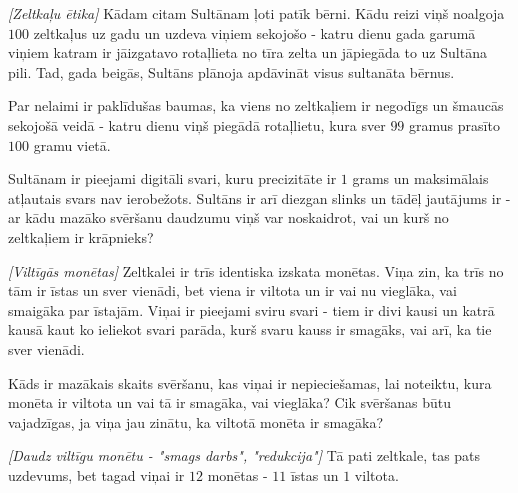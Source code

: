 




\noindent 

\begin{problem}
\textit{[Zeltkaļu ētika]}
Kādam citam Sultānam ļoti patīk bērni. Kādu reizi viņš noalgoja $100$ zeltkaļus uz gadu un uzdeva viņiem sekojošo - katru dienu gada garumā viņiem katram ir jāizgatavo rotaļlieta no tīra zelta un jāpiegāda to uz Sultāna pili. Tad, gada beigās, Sultāns plānoja apdāvināt visus sultanāta bērnus. 

Par nelaimi ir paklīdušas baumas, ka viens no zeltkaļiem ir negodīgs un šmaucās sekojošā veidā - katru dienu viņš piegādā rotaļlietu, kura sver $99$ gramus prasīto $100$ gramu vietā.

Sultānam ir pieejami digitāli svari, kuru precizitāte ir $1$ grams un maksimālais atļautais svars nav ierobežots. Sultāns ir arī diezgan slinks un tādēļ jautājums ir - ar kādu mazāko svēršanu daudzumu viņš var noskaidrot, vai un kurš no zeltkaļiem ir krāpnieks?
\end{problem}
%

\begin{problem}
\textit{[Viltīgās monētas]}
Zeltkalei ir trīs identiska izskata monētas. Viņa zin, ka trīs no tām ir īstas un sver vienādi, bet viena ir viltota un ir vai nu vieglāka, vai smaigāka par īstajām. 
Viņai ir pieejami sviru svari - tiem ir divi kausi un katrā kausā kaut ko ieliekot svari parāda, kurš svaru kauss ir smagāks, vai arī, ka tie sver vienādi.

Kāds ir mazākais skaits svēršanu, kas viņai ir nepieciešamas, lai noteiktu, kura monēta ir viltota un vai tā ir smagāka, vai vieglāka? Cik svēršanas būtu vajadzīgas, ja viņa jau zinātu, ka viltotā monēta ir smagāka?

\end{problem}
%

\begin{problem}
\textit{[Daudz viltīgu monētu - "smags darbs", "redukcija"]}
Tā pati zeltkale, tas pats uzdevums, bet tagad viņai ir $12$ monētas - $11$ īstas un $1$ viltota. 
\end{problem}
%


